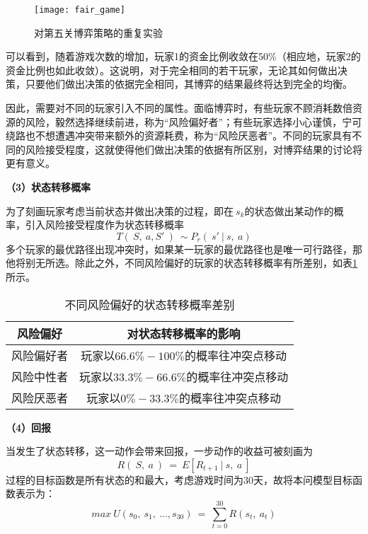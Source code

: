 \documentclass[bwprint]{cumcmthesis} %
\begin{document}
\begin{figure}[!h]
    \centering
    \texttt{[image: fair\_game]}
    \caption{对第五关博弈策略的重复实验}
    \label{fair_game}
\end{figure}

可以看到，随着游戏次数的增加，玩家1的资金比例收敛在50\%（相应地，玩家2的资金比例也如此收敛）。这说明，对于完全相同的若干玩家，无论其如何做出决策，只要他们做出决策的依据完全相同，其博弈的结果最终将达到完全的均衡。

因此，需要对不同的玩家引入不同的属性。面临博弈时，有些玩家不顾消耗数倍资源的风险，毅然选择继续前进，称为“风险偏好者”；有些玩家选择小心谨慎，宁可绕路也不想遭遇冲突带来额外的资源耗费，称为“风险厌恶者”。不同的玩家具有不同的风险接受程度，这就使得他们做出决策的依据有所区别，对博弈结果的讨论将更有意义。

\textbf{（3）状态转移概率}

为了刻画玩家考虑当前状态并做出决策的过程，即在$ \ s_k $的状态做出某动作的概率，引入风险接受程度作为状态转移概率
\begin{equation}
    T(\ S,\ a,S\prime\ )\ \sim P_r(\ s\prime\ |\ s,\ a)
\end{equation}
多个玩家的最优路径出现冲突时，如果某一玩家的最优路径也是唯一可行路径，那他将别无所选。除此之外，不同风险偏好的玩家的状态转移概率有所差别，如表\ref{tab:p6RiskPreference}所示。

\begin{table}[!htbp]
    \caption{不同风险偏好的状态转移概率差别}\label{tab:p6RiskPreference} 
    \centering
    \begin{tabular}{cc}
        \toprule[1.5pt]
        风险偏好 & 对状态转移概率的影响 \\
        \midrule[1pt]
        风险偏好者 & 玩家以$66.6\%-100\%$的概率往冲突点移动\\
        风险中性者 & 玩家以$33.3\%-66.6\%$的概率往冲突点移动 \\
        风险厌恶者 & 玩家以$0\%-33.3\%$的概率往冲突点移动 \\
        \bottomrule[1.5pt]
    \end{tabular}
\end{table}

\textbf{（4）回报}

当发生了状态转移，这一动作会带来回报，一步动作的收益可被刻画为
\begin{equation}
R(\ S,\ a\ )\ =\ E[R_{t+1}\ |\ s,\ a\ ]
\end{equation}
过程的目标函数是所有状态的和最大，考虑游戏时间为30天，故将本问模型目标函数表示为：
\begin{equation}
\ max\ U(s_0,\ s_1,\ ...,s_{30})\ =\ \sum_{t=0}^{30}{R(s_t,\ a_t)\ }
\end{equation}
\end{document}

